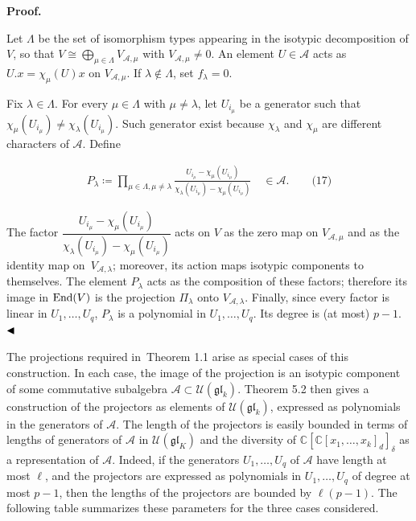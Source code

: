 \par\medskip\noindent\textbf{Proof.}\par




Let $\Lambda$ be the set of isomorphism types appearing in the isotypic decomposition of $V$, so that $V\cong\bigoplus_{\mu\in\Lambda}V_{\mathcal{A},\mu}$ with $V_{\mathcal{A},\mu}\neq 0$. An element $U\in\mathcal{A}$ acts as $U.x=\chi_{\mu}(U)x$ on $V_{\mathcal{A},\mu}$. If $\lambda\notin\Lambda$, set $f_{\lambda}=0$.





Fix $\lambda\in\Lambda$. For every $\mu\in\Lambda$ with $\mu\neq\lambda$, let $U_{i_{\mu}}$ be a generator such that $\chi_{\mu}(U_{i_{\mu}})\neq\chi_{\lambda}(U_{i_{\mu}})$. Such generator exist because $\chi_{\lambda}$ and $\chi_{\mu}$ are different characters of $\mathcal{A}$. Define



\[\begin{aligned}
\displaystyle P_{\lambda}\coloneqq\prod_{\mu\in\Lambda,\mu\neq\lambda}\frac{U_{i_{\mu}}-\chi_{\mu}(U_{i_{\mu}})}{\chi_{\lambda}(U_{i_{\mu}})-\chi_{\mu}(U_{i_{\mu}})}\quad\in\mathcal{A}.\qquad\text{(17)}
\end{aligned}\]


The factor $\dfrac{U_{i_{\mu}}-\chi_{\mu}(U_{i_{\mu}})}{\chi_{\lambda}(U_{i_{\mu}})-\chi_{\mu}(U_{i_{\mu}})}$ acts on $V$ as the zero map on $V_{\mathcal{A},\mu}$ and as the identity map on $V_{\mathcal{A},\lambda}$; moreover, its action maps isotypic components to themselves. The element $P_{\lambda}$ acts as the composition of these factors; therefore its image in $\textnormal{End}(V)$ is the projection $\Pi_{\lambda}$ onto $V_{\mathcal{A},\lambda}$. Finally, since every factor is linear in $U_{1},\ldots,U_{q}$, $P_{\lambda}$ is a polynomial in $U_{1},\ldots,U_{q}$. Its degree is (at most) $p-1$.
$\hfill\blacktriangleleft$





The projections required in Theorem 1.1 arise as special cases of this construction.
In each case, the image of the projection is an isotypic component of some commutative subalgebra $\mathcal{A}\subset\mathcal{U}(\mathfrak{gl}_{k})$.
Theorem 5.2 then gives a construction of the projectors as elements of $\mathcal{U}(\mathfrak{gl}_{k})$, expressed as polynomials in the generators of $\mathcal{A}$.
The length of the projectors is easily bounded in terms of lengths of generators of $\mathcal{A}$ in $\mathcal{U}(\mathfrak{gl}_{K})$ and the diversity of $\mathbb{C}[\mathbb{C}[x_{1},\ldots,x_{k}]_{d}]_{\delta}$ as a representation of $\mathcal{A}$.
Indeed, if the generators $U_{1},\dots,U_{q}$ of $\mathcal{A}$ have length at most $\ell$, and the projectors are expressed as polynomials in $U_{1},\dots,U_{q}$ of degree at most $p-1$, then the lengths of the projectors are bounded by $\ell(p-1)$. The following table summarizes these parameters for the three cases considered.




